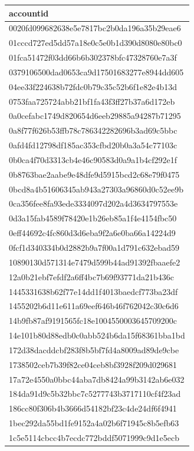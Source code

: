 \begin{tabular}{l}
\toprule
accountid \\
\midrule
0020fd099682638e5e7817bc2b0da196a35b29eae6 \\
01cccd727ed5dd57a18e0c5e0b1d390d8080e80bc0 \\
01fca51472f03dd66b6b302378bfc47328760e7a3f \\
0379106500dad0653ca9d17501683277e8944dd605 \\
04ee33f224638b72fdc0b79c35c52b6f1e82e4b13d \\
0753faa725724abb21bf1fa43f3ff27b37a6d172eb \\
0a0cefabc1749d820654d6eeb29885a94287b71295 \\
0a8f77f626b53ffb78c786342282696b3ad69c5bbc \\
0afd4fd12798df185ac353cfbd20b0a3a54c77103c \\
0b0ca4f70d3313cb4e46c90583d0a9a1b4cf292e1f \\
0b8763bae2aabe9e48dfe9d5915bcd2c68e79f0475 \\
0bcd8a4b51606345ab943a27303a96860d0c52ee9b \\
0ca356fee8fa93ede3334097d202a4d3634797553e \\
0d3a15fab4589f78420e1b26eb85a1f4e4154fbc50 \\
0eff44692c4fc860d3d6eba9f2a6e0ba66a14224d9 \\
0fcf1d340334b0d2882b9a7f00a1d791c632ebad59 \\
10890130d571314e7479d599b44ad91392fbaaefe2 \\
12a0b21ebf7efdf2a6ff4bc7b69f93771da21b436c \\
1445331638b62f77e14dd1f4013baedcf773ba23df \\
1455202b6d11e611a69eef646b46f762042c30c6d6 \\
14b9fb87af9191565fc18e1004550003645709200c \\
14e101b80d88edb0c0abb524b6da15f68361bba1bd \\
172d38dacddcbf283f8b5bf7fd4a8009ad89de9cbe \\
1738502ceb7b39f82ce04ceb8bf3928f209d029681 \\
17a72e4550a0bbc44aba7db8424a99b3142ab6e032 \\
184da91d9c5b32bbc7c5277743b3717110cf4f23ad \\
186cc80f306b4b3666d54182bf23c4de24df6f4941 \\
1bec292da55bd1fe9152a4a02b6f71945c8b5efb63 \\
1c5e5114cbcc4b7ecdc772bddf5071999c9d1e5ecb \\

\end{tabular}
